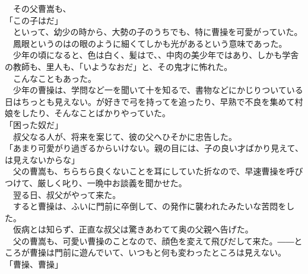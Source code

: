 \documentclass[
  paper=a5,
  fontsize=10pt,
  jafontsize=9.5pt,
  tate,                  %
  open_bracket_pos=nibu, %
]{jlreq}
\begin{document}
　その父曹嵩も、\\


「この子はだ」\\


　といって、幼少の時から、大勢の子のうちでも、特に曹操を可愛がっていた。\\


　鳳眼というのはの眼のように細くてしかも光があるという意味であった。\\


　少年の頃になると、色は白く、髪はで、、中肉の美少年ではあり、しかも学舎の教師も、里人も、「いようなおだ」と、その鬼才に怖れた。\\


　こんなこともあった。\\


　少年の曹操は、学問など一を聞いて十を知るで、書物などにかじりついている日はちっとも見えない。が好きで弓を持ってを追ったり、早熟で不良を集めて村娘をしたり、そんなことばかりやっていた。\\


「困った奴だ」\\


　叔父なる人が、将来を案じて、彼の父へひそかに忠告した。\\


「あまり可愛がり過ぎるからいけない。親の目には、子の良い才ばかり見えて、は見えないからな」\\


　父の曹嵩も、ちらちら良くないことを耳にしていた折なので、早速曹操を呼びつけて、厳しく叱り、一晩中お談義を聞かせた。\\


　翌る日、叔父がやって来た。\\


　すると曹操は、ふいに門前に卒倒して、の発作に襲われたみたいな苦悶をした。\\


　仮病とは知らず、正直な叔父は驚きあわてて奥の父親へ告げた。\\


　父の曹嵩も、可愛い曹操のことなので、顔色を変えて飛びだして来た。――ところが曹操は門前に遊んでいて、いつもと何も変わったところは見えない。\\


「曹操、曹操」\\
\end{document}
